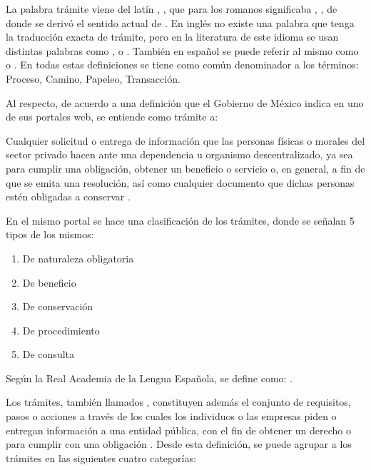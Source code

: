 La palabra trámite viene del latín , , que para los romanos significaba , , de donde se derivó el sentido actual de \cite{TramiteCastellanoPagina}.
En inglés no existe una palabra que tenga la traducción exacta de trámite, pero en la literatura de este idioma se usan distintas palabras como ,  o .
También en español se puede referir al mismo como  o .
En todas estas definiciones se tiene como común denominador a los términos: Proceso, Camino, Papeleo, Transacción.

Al respecto, de acuerdo a una definición que el Gobierno de México indica en uno de sus portales web, se entiende como trámite a:

\begin{displayquote}
    Cualquier solicitud o entrega de información que las personas físicas o morales del sector privado hacen ante una dependencia u organismo descentralizado,
    ya sea para cumplir una obligación, obtener un beneficio o servicio o, en general, a fin de que se emita una resolución, así como cualquier documento que dichas personas estén obligadas a conservar \cite{epnQueEsTramite}.
\end{displayquote}

En el mismo portal se hace una clasificación de los trámites, donde se señalan 5 tipos de los mismos:

\begin{enumerate}
    \item De naturaleza obligatoria
    \item De beneficio
    \item De conservación
    \item De procedimiento
    \item De consulta
\end{enumerate}

Según la Real Academia de la Lengua Española, se define como:
 \parencite{asaleDiccionarioLenguaEspanola}.

Los trámites, también llamados , constituyen además
el conjunto de requisitos, pasos o acciones a través de los cuales los individuos o las empresas piden o entregan información a una entidad pública, con el fin de obtener un derecho o para cumplir con una obligación \cite[36]{rosethFinTramiteEterno2018}.
Desde esta definición, se puede agrupar a los trámites en las siguientes cuatro categorías:

